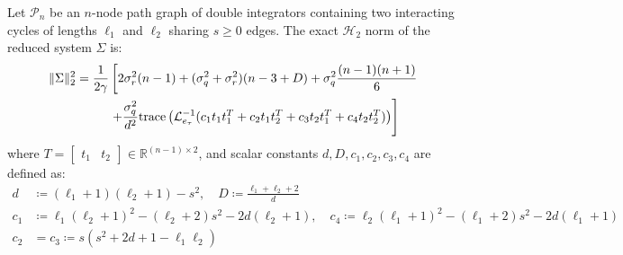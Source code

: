 \begin{theo}\label{ch_RA_theo2}
Let $\mathcal{P}_n$ be an $n$-node path graph of double integrators containing two interacting cycles of lengths $\ell_1$ and $\ell_2$ sharing $s \ge 0$ edges. The exact $\mathcal{H}_2$ norm of the reduced system $\Sigma$ is:
\begin{align}\label{two_cycle_norm}
	\|\Sigma\|_2^2 = \frac{1}{2\gamma} &\left[ 2\sigma_r^2(n-1) + (\sigma_q^2 + \sigma_r^2)(n - 3 + D) + \sigma_q^2 \frac{(n-1)(n+1)}{6} \right. \nonumber \\
	&\left. + \frac{\sigma_q^2}{d^2} \text{trace}\left( \mathcal{L}_{e_{\tau}}^{-1} (c_1 t_1 t_1^T + c_2 t_1 t_2^T + c_3 t_2 t_1^T + c_4 t_2 t_2^T) \right) \right]
\end{align}
where $T = \begin{bmatrix} t_1 & t_2 \end{bmatrix} \in \mathbb{R}^{(n-1) \times 2}$, and scalar constants $d, D, c_1, c_2, c_3, c_4$ are defined as:
\begin{align}\label{eq:ch_RA_two_cycle_constants}
	d &\coloneqq (\ell_1+1)(\ell_2+1) - s^2, \quad D \coloneqq \frac{\ell_1 + \ell_2 + 2}{d} \nonumber \\
	c_1 &\coloneqq \ell_1(\ell_2+1)^2 - (\ell_2+2)s^2 - 2d(\ell_2+1), \quad c_4 \coloneqq \ell_2(\ell_1+1)^2 - (\ell_1+2)s^2 - 2d(\ell_1+1) \nonumber \\
	c_2 &= c_3 \coloneqq s(s^2 + 2d + 1 - \ell_1 \ell_2)
\end{align}
\end{theo}

